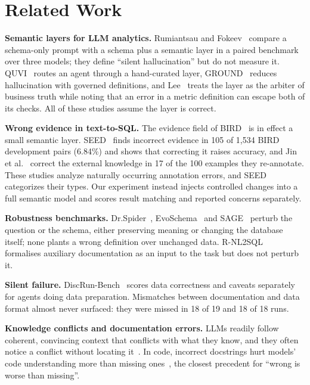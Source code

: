 \documentclass[conference]{IEEEtran}
\begin{document}
\section{Related Work}

\textbf{Semantic layers for LLM analytics.} Rumiantsau and Fokeev~\cite{rumiantsau2026} compare a schema-only prompt with a schema plus a semantic layer in a paired benchmark over three models; they define ``silent hallucination'' but do not measure it. QUVI~\cite{kim2026quvi} routes an agent through a hand-curated layer, GROUND~\cite{pillai2026ground} reduces hallucination with governed definitions, and Lee~\cite{lee2026} treats the layer as the arbiter of business truth while noting that an error in a metric definition can escape both of its checks. All of these studies assume the layer is correct.

\textbf{Wrong evidence in text-to-SQL.} The evidence field of BIRD~\cite{li2023bird} is in effect a small semantic layer. SEED~\cite{yun2025seed} finds incorrect evidence in 105 of 1,534 BIRD development pairs (6.84\%) and shows that correcting it raises accuracy, and Jin et al.~\cite{jin2026annotation} correct the external knowledge in 17 of the 100 examples they re-annotate. These studies analyze naturally occurring annotation errors, and SEED categorizes their types. Our experiment instead injects controlled changes into a full semantic model and scores result matching and reported concerns separately.

\textbf{Robustness benchmarks.} Dr.Spider~\cite{chang2023drspider}, EvoSchema~\cite{zhang2026evoschema} and SAGE~\cite{wang2026sage} perturb the question or the schema, either preserving meaning or changing the database itself; none plants a wrong definition over unchanged data. R-NL2SQL~\cite{tu2026rnl2sql} formalises auxiliary documentation as an input to the task but does not perturb it.

\textbf{Silent failure.} DiscRun-Bench~\cite{chen2026discrun} scores data correctness and caveats separately for agents doing data preparation. Mismatches between documentation and data format almost never surfaced: they were missed in 18 of 19 and 18 of 18 runs.

\textbf{Knowledge conflicts and documentation errors.} LLMs readily follow coherent, convincing context that conflicts with what they know, and they often notice a conflict without locating it~\cite{xu2024conflicts}. In code, incorrect docstrings hurt models' code understanding more than missing ones~\cite{macke2024docs}, the closest precedent for ``wrong is worse than missing''.
\end{document}
